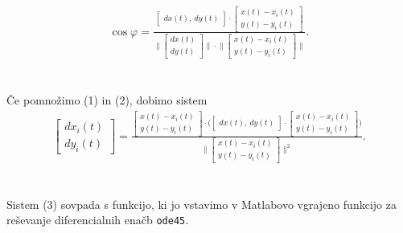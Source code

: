 \documentclass[a4paper,12pt]{article}
\begin{document}
\begin{align}
    \cos\varphi = 
    \frac{
    \begin{bmatrix} 
        dx(t), \ %
        dy(t)
    \end{bmatrix}
    \cdot
    \begin{bmatrix} 
        x(t) - x_i(t) \\
        y(t) - y_i(t)
    \end{bmatrix}
    }
    {
    \Big \|
    \begin{bmatrix} 
        dx(t) \\
        dy(t)
    \end{bmatrix}
    \Big \| 
    \cdot
    \Big \|
    \begin{bmatrix} 
        x(t) - x_i(t) \\
        y(t) - y_i(t)
    \end{bmatrix}
    \Big \| 
    }
    .
\end{align}
\\
\\
Če pomnožimo (1) in (2), dobimo sistem \\
\begin{align}
    \begin{bmatrix} 
        dx_i(t) \\
        dy_i(t) 
    \end{bmatrix}
    =
    \frac{
    \begin{bmatrix} 
        x(t) - x_i(t) \\
        y(t) - y_i(t)
    \end{bmatrix}
    \cdot
    \Big(
    \begin{bmatrix} 
        dx(t), \ %
        dy(t)
    \end{bmatrix}
    \cdot
    \begin{bmatrix} 
        x(t) - x_i(t) \\
        y(t) - y_i(t)
    \end{bmatrix}
    \Big)
    }
    {
    \Big \|
    \begin{bmatrix} 
        x(t) - x_i(t) \\
        y(t) - y_i(t)
    \end{bmatrix}
    \Big \| ^ {2}
    }
    .
\end{align}
\\
\\
Sistem (3) sovpada s funkcijo, ki jo vstavimo v Matlabovo vgrajeno funkcijo za reševanje diferencialnih enačb 
{\texttt{ode45}}.
\\
\\
\end{document}
